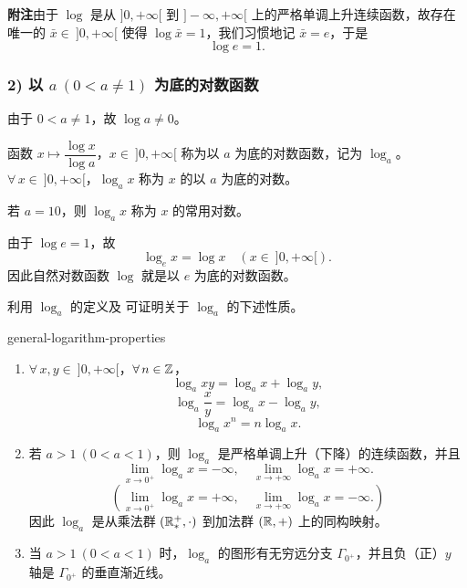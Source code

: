 \textbf{附注}\quad 由于 \(\log\) 是从 \(]0,+\infty[\) 到 \(]-\infty,+\infty[\) 上的严格单调上升连续函数，故存在唯一的 \(\bar x\in\ ]0,+\infty[\) 使得 \(\log\bar x=1\)，我们习惯地记 \(\bar x=e\)，于是
\[
\log e=1.
\]

\subsubsection*{2) 以 \(a\ (0<a\neq1)\) 为底的对数函数}

由于 \(0<a\neq1\)，故 \(\log a\neq0\)。

\begin{mydef*}{}

	函数 \(x\longmapsto\dfrac{\log x}{\log a}\)，\(x\in\ ]0,+\infty[\) 称为以 \(a\) 为底的对数函数，记为 \(\log_a\)。\(\forall\,x\in\ ]0,+\infty[\)，\(\log_a x\) 称为 \(x\) 的以 \(a\) 为底的对数。

\end{mydef*}

若 \(a=10\)，则 \(\log_a x\) 称为 \(x\) 的常用对数。

由于 \(\log e=1\)，故
\[
\log_e x=\log x\quad(x\in\ ]0,+\infty[).
\]
因此自然对数函数 \(\log\) 就是以 \(e\) 为底的对数函数。

利用 \(\log_a\) 的定义及 可证明关于 \(\log_a\) 的下述性质。

\begin{mythm}{}{general-logarithm-properties}

	\begin{enumerate}[label=\arabic*)]
		\item \(\forall\,x,y\in\ ]0,+\infty[\)，\(\forall\,n\in\mathbb{Z}\)，
		\[
		\log_a xy=\log_a x+\log_a y,
		\]
		\[
		\log_a\frac xy=\log_a x-\log_a y,
		\]
		\[
		\log_a x^n=n\log_a x.
		\]

		\item 若 \(a>1\ (0<a<1)\)，则 \(\log_a\) 是严格单调上升（下降）的连续函数，并且
		\[
		\lim_{x\to0^+}\log_a x=-\infty,\quad\lim_{x\to+\infty}\log_a x=+\infty.
		\]
		\[
		\left(\lim_{x\to0^+}\log_a x=+\infty,\quad\lim_{x\to+\infty}\log_a x=-\infty.\right)
		\]
		因此 \(\log_a\) 是从乘法群 \((\mathbb{R}_*^+,\cdot)\) 到加法群 \((\mathbb{R},+)\) 上的同构映射。

		\item 当 \(a>1\ (0<a<1)\) 时，\(\log_a\) 的图形有无穷远分支 \(\Gamma_{0^+}\)，并且负（正）\(y\) 轴是 \(\Gamma_{0^+}\) 的垂直渐近线。
	\end{enumerate}

\end{mythm}

